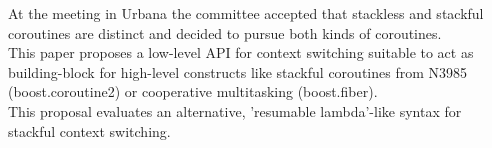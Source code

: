 At the meeting in Urbana the committee accepted that stackless and stackful
coroutines are distinct and decided to pursue both kinds of coroutines.\\
This paper proposes a low-level API for context switching suitable to act as 
building-block for high-level constructs like stackful coroutines from
N3985\cite{N3985} (boost.coroutine2\cite{bcoroutine2}) or cooperative
multitasking (boost.fiber\cite{bfiber}).\\
This proposal evaluates an alternative, 'resumable lambda'-like syntax for
stackful context switching.
